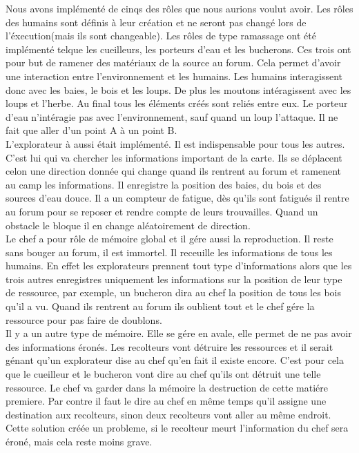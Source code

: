 \documentclass[12pt]{article}
\begin{document}
Nous avons implémenté de cinqs des rôles que nous aurions voulut avoir.
Les rôles des humains sont définis à leur création et ne seront pas changé lors de l'éxecution(mais ils sont changeable).
Les rôles de type ramassage ont été implémenté telque les cueilleurs, les porteurs d'eau et les bucherons.
Ces trois ont pour but de ramener des matériaux de la source au forum. Cela permet d'avoir une interaction entre l'environnement et 
les humains. Les humains interagissent donc avec les baies, le bois et les loups. De plus les moutons intéragissent avec les loups et l'herbe.
Au final tous les éléments créés sont reliés entre eux.
Le porteur d'eau n'intéragie pas avec l'environnement, sauf quand un loup l'attaque. Il ne fait que aller d'un point A à un point B.\\
L'explorateur à aussi était implémenté. Il est indispensable pour tous les autres. C'est lui qui va chercher les informations important de la carte.
Ils se déplacent celon une direction donnée qui change quand ils rentrent au forum et ramenent au camp les informations.
Il enregistre la position des baies, du bois et des sources d'eau douce. Il a un compteur de fatigue, dès qu'ils sont fatigués il rentre au forum
pour se reposer et rendre compte de leurs trouvailles. Quand un obstacle le bloque il en change aléatoirement de direction.\\
Le chef a pour rôle de mémoire global et il gére aussi la reproduction. Il reste sans bouger au forum, il est immortel.
Il receuille les informations de tous les humains. En effet les explorateurs prennent tout type d'informations alors que 
les trois autres enregistres uniquement les informations sur la position de leur type de ressource, par exemple, un bucheron dira au chef la position de tous les
bois qu'il a vu. Quand ils rentrent au forum ils oublient tout et le chef gére la ressource pour pas faire de doublons.\\
Il y a un autre type de mémoire. Elle se gére en avale, elle permet de ne pas avoir des informations éronés.
Les recolteurs vont détruire les ressources et il serait génant qu'un explorateur dise au
chef qu'en fait il existe encore. C'est pour cela que le cueilleur et le bucheron vont dire au chef qu'ils ont détruit une telle ressource.
Le chef va garder dans la mémoire la destruction de cette matiére premiere. Par contre il faut le dire au chef en même temps qu'il assigne
une destination aux recolteurs, sinon deux recolteurs vont aller au même endroit.
Cette solution créée un probleme, si le recolteur meurt l'information du chef sera éroné, mais cela reste moins grave.
\end{document}
